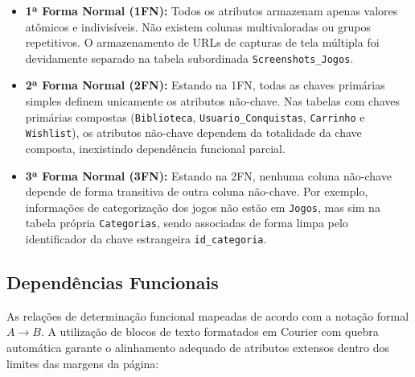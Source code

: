 \documentclass[12pt,a4paper]{article}
\begin{document}
\begin{itemize}
    \item \textbf{1ª Forma Normal (1FN):} Todos os atributos armazenam apenas valores atômicos e indivisíveis. Não existem colunas multivaloradas ou grupos repetitivos. O armazenamento de URLs de capturas de tela múltipla foi devidamente separado na tabela subordinada \texttt{Screenshots\_Jogos}.
    \item \textbf{2ª Forma Normal (2FN):} Estando na 1FN, todas as chaves primárias simples definem unicamente os atributos não-chave. Nas tabelas com chaves primárias compostas (\texttt{Biblioteca}, \texttt{Usuario\_Conquistas}, \texttt{Carrinho} e \texttt{Wishlist}), os atributos não-chave dependem da totalidade da chave composta, inexistindo dependência funcional parcial.
    \item \textbf{3ª Forma Normal (3FN):} Estando na 2FN, nenhuma coluna não-chave depende de forma transitiva de outra coluna não-chave. Por exemplo, informações de categorização dos jogos não estão em \texttt{Jogos}, mas sim na tabela própria \texttt{Categorias}, sendo associadas de forma limpa pelo identificador da chave estrangeira \texttt{id\_categoria}.
\end{itemize}

\subsection{Dependências Funcionais}
As relações de determinação funcional mapeadas de acordo com a notação formal $A \rightarrow B$. A utilização de blocos de texto formatados em Courier com quebra automática garante o alinhamento adequado de atributos extensos dentro dos limites das margens da página:
\end{document}

